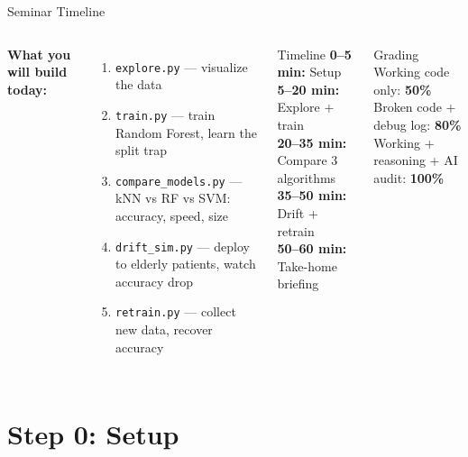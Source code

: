 \documentclass[aspectratio=169,11pt]{beamer}
\begin{document}
\begin{frame}{Seminar Timeline}
    \begin{columns}
        \textbf{What you will build today:}
        \begin{enumerate}
            \item \texttt{explore.py} --- visualize the data
            \item \texttt{train.py} --- train Random Forest, learn the split trap
            \item \texttt{compare\_models.py} --- kNN vs RF vs SVM: accuracy, speed, size
            \item \texttt{drift\_sim.py} --- deploy to elderly patients, watch accuracy drop
            \item \texttt{retrain.py} --- collect new data, recover accuracy
        \end{enumerate}

        \begin{alertblock}{Timeline}
            \textbf{0--5 min:} Setup\\
            \textbf{5--20 min:} Explore + train\\
            \textbf{20--35 min:} Compare 3 algorithms\\
            \textbf{35--50 min:} Drift + retrain\\
            \textbf{50--60 min:} Take-home briefing
        \end{alertblock}

        \vspace{0.2cm}
        \begin{exampleblock}{Grading}
            Working code only: \textbf{50\%}\\
            Broken code + debug log: \textbf{80\%}\\
            Working + reasoning + AI audit: \textbf{100\%}
        \end{exampleblock}
    \end{columns}
\end{frame}

\section{Step 0: Setup}
\end{document}
